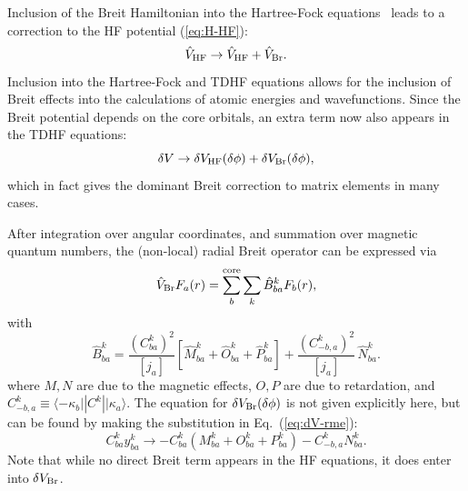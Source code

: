 \documentclass[10pt,twocolumn,a4paper]{article}%
\newcommand{\bra}[1]{\ensuremath{\langle #1|}}	%
\newcommand{\ket}[1]{\ensuremath{|#1\rangle}}	%
\newcommand{\be}{\begin{equation}}
\newcommand{\ee}{\end{equation}}
\renewcommand{\k}{\ensuremath{\kappa}}
\begin{document}
Inclusion of the Breit Hamiltonian into the Hartree-Fock equations~\cite{Derevianko2001} leads to a correction to the HF potential (\ref{eq:H-HF}):
\be
\hat V_{\rm HF} \to  \hat V_{\rm HF}  + \hat V_{\rm Br} .
\ee
Inclusion into the Hartree-Fock and TDHF equations allows for the inclusion of Breit effects into the calculations of atomic energies and wavefunctions.
Since the Breit potential depends on the core orbitals, an extra term now also appears in the TDHF equations:
\be
\delta V\to \delta V_{\rm HF}(\delta\phi)+\delta V_{\rm Br}(\delta\phi),
\ee
which in fact gives the dominant Breit correction to matrix elements in many cases.


After integration over angular coordinates, and summation over magnetic quantum numbers, the (non-local) radial Breit operator can be expressed via
\be\label{eq:HF_Breit}
\hat V_{\rm Br} F_a(r) = \sum_b^{\rm core}\sum_k \hat B^k_{ba}F_b(r),
\ee
with
\begin{equation}
\hat B^k_{ba} =   \frac{(C^k_{ba})^2 }{[j_a]}  \left[\hat M^k_{ba} + \hat O^k_{ba} + \hat P^k_{ba}\right]
 +
 \frac{(C^k_{-b,a})^2}{[j_a]} \, \hat N^k_{ba}.
\end{equation}
where
$M,N$ are due to the magnetic effects, $O,P$ are due to retardation, and
 $C^k_{-b,a} \equiv \bra{-\k_b}|C^k|\ket{\k_a}$.
The equation for $\delta V_{\rm Br}(\delta\phi)$ is not given explicitly here,
but can be found by making the substitution in Eq.~(\ref{eq:dV-rme}):
\[
C^k_{ba}y^k_{ba}\to -C^k_{ba}(M_{ba}^k+O_{ba}^k+P_{ba}^k)  -C^k_{-b,a}N_{ba}^k.
\]
Note that while no direct Breit term appears in the HF equations, it does enter into $\delta V_{\rm Br}$.
\end{document}
